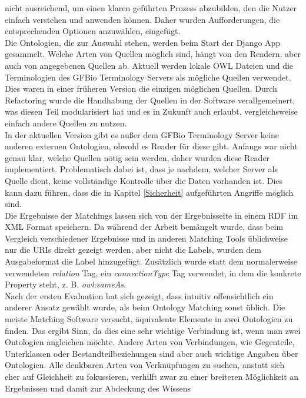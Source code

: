 nicht ausreichend, um einen klaren geführten Prozess abzubilden, den die Nutzer
einfach verstehen und anwenden können. Daher wurden Aufforderungen, die
entsprechenden Optionen anzuwählen, eingefügt.\\
Die Ontologien, die zur Auswahl stehen, werden beim Start der Django App
gesammelt. Welche Arten von Quellen möglich sind, hängt von den Readern, aber
auch von angegebenen Quellen ab. Aktuell werden lokale OWL Dateien und die
Terminologien des GFBio Terminology Servers als mögliche Quellen verwendet. Dies
waren in einer früheren Version die einzigen möglichen Quellen. Durch
Refactoring wurde die Handhabung der Quellen in der Software verallgemeinert,
was diesen Teil modularisiert hat und es in Zukunft auch erlaubt, vergleichsweise einfach andere
Quellen zu nutzen.\\
In der aktuellen Version gibt es außer dem GFBio Terminology Server keine
anderen externen Ontologien, obwohl es Reader für diese gibt. Anfangs war
nicht genau klar, welche Quellen nötig sein werden, daher wurden diese Reader
implementiert. Problematisch dabei ist, dass je nachdem, welcher Server als
Quelle dient, keine vollständige Kontrolle über die Daten vorhanden ist. Dies
kann dazu führen, dass die in Kapitel \ref{Sicherheit} aufgeführten Angriffe
möglich sind.\\
Die Ergebnisse der Matchings lassen sich von der Ergebnisseite in einem RDF
im XML Format speichern. Da während der Arbeit bemängelt wurde, dass beim
Vergleich verschiedener Ergebnisse und in anderen Matching Tools üblichweise nur
die URIs direkt gezeigt werden, aber nicht die Labels, wurden dem Ausgabeformat
die Label hinzugefügt. Zusätzlich wurde statt dem normalerweise verwendeten
\textit{relation} Tag, ein \textit{connectionType} Tag verwendet, in dem die
konkrete Property steht, z. B. \textit{owl:sameAs}.\\
Nach der ersten Evaluation hat sich gezeigt, dass intuitiv offensichtlich ein
anderer Ansatz gewählt wurde, als beim Ontology Matching sonst üblich. Die
meiste Matching Software versucht, äquivalente Elemente in zwei Ontologien zu
finden. Das ergibt Sinn, da dies eine sehr wichtige Verbindung ist, wenn man
zwei Ontologien angleichen möchte. Andere Arten von Verbindungen, wie
Gegenteile, Unterklassen oder Bestandteilbeziehungen sind aber auch wichtige
Angaben über Ontologien. Alle denkbaren Arten von Verknüpfungen zu suchen,
anstatt sich eher auf Gleichheit zu fokussieren, verhilft zwar zu einer
breiteren Möglichkeit an Ergebnissen und damit zur Abdeckung des Wissens
